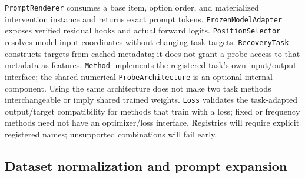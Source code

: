 \documentclass[11pt]{article}
\begin{document}
\texttt{PromptRenderer} consumes a base item, option order, and materialized intervention instance and returns exact prompt tokens.
\texttt{FrozenModelAdapter} exposes verified residual hooks and actual forward logits.
\texttt{PositionSelector} resolves model-input coordinates without changing task targets.
\texttt{RecoveryTask} constructs targets from cached metadata; it does not grant a probe access to that metadata as features.
\texttt{Method} implements the registered task's own input/output interface; the shared numerical \texttt{ProbeArchitecture} is an optional internal component.
Using the same architecture does not make two task methods interchangeable or imply shared trained weights.
\texttt{Loss} validates the task-adapted output/target compatibility for methods that train with a loss; fixed or frequency methods need not have an optimizer/loss interface.
Registries will require explicit registered names; unsupported combinations will fail early.

\subsection{Dataset normalization and prompt expansion}
\end{document}
